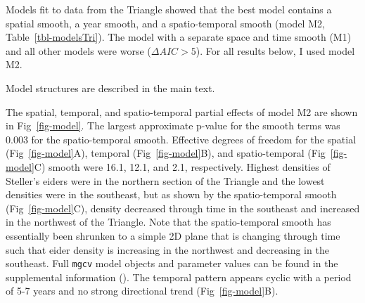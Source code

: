 \documentclass[
  10pt,
  letterpaper,
]{article}
\begin{document}
Models fit to data from the Triangle showed that the best model contains
a spatial smooth, a year smooth, and a spatio-temporal smooth (model M2,
Table~\ref{tbl-modelsTri}). The model with a separate space and time
smooth (M1) and all other models were worse (\(\Delta AIC >5\)). For all
results below, I used model M2.

\begin{table}

\caption{\label{tbl-modelsTri}\textbf{AIC table for models fit to Triangle data.}}

\begin{flushleft} Model structures are described in the main text.
\end{flushleft}
\end{table}%

The spatial, temporal, and spatio-temporal partial effects of model M2
are shown in Fig~\ref{fig-model}. The largest approximate p-value for
the smooth terms was 0.003 for the spatio-temporal smooth. Effective
degrees of freedom for the spatial (Fig~\ref{fig-model}A), temporal (Fig~\ref{fig-model}B), and spatio-temporal (Fig~\ref{fig-model}C) smooth
were 16.1, 12.1, and 2.1, respectively. Highest densities of Steller's
eiders were in the northern section of the Triangle and the lowest
densities were in the southeast, but as shown by the spatio-temporal
smooth (Fig~\ref{fig-model}C), density decreased through time in the
southeast and increased in the northwest of the Triangle. Note that the
spatio-temporal smooth has essentially been shrunken to a simple 2D
plane that is changing through time such that eider density is
increasing in the northwest and decreasing in the southeast. Full
\texttt{mgcv} model objects and parameter values can be found in the
supplemental information (). The temporal pattern
appears cyclic with a period of 5-7 years and no strong directional
trend (Fig~\ref{fig-model}B).
\end{document}
